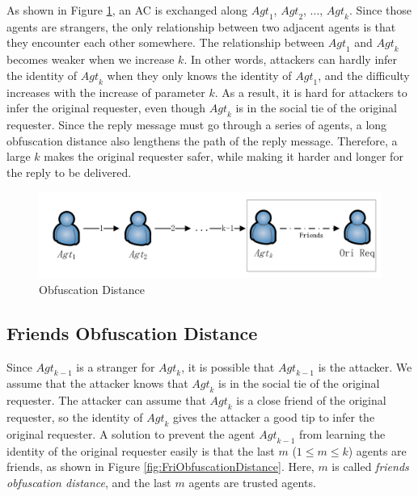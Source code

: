 As shown in Figure \ref{fig:ObfuscationDistance}, an AC is exchanged along ${Agt}_1$, ${Agt}_2$, ..., ${Agt}_k$. Since those agents are strangers, the only relationship between two adjacent agents is that they encounter each other somewhere. The relationship between ${Agt}_1$ and ${Agt}_k$ becomes weaker when we increase $k$. In other words, attackers can hardly infer the identity of ${Agt}_k$ when they only knows the identity of ${Agt}_1$, and the difficulty increases with the increase of parameter $k$. As a result, it is hard for attackers to infer the original requester, even though ${Agt}_k$ is in the social tie of the original requester. Since the reply message must go through a series of agents, a long obfuscation distance also lengthens the path of the reply message. Therefore, a large $k$ makes the original requester safer, while making it harder and longer for the reply to be delivered.

\begin{figure} [hbtp]
  \centering 
  \includegraphics[width=6.0in]{figures/ACPObfDis.png}
  \caption{Obfuscation Distance} 
  \label{fig:ObfuscationDistance} %
\end{figure}

\subsection{ Friends Obfuscation Distance}

\noindent Since ${Agt}_{k-1}$ is a stranger for ${Agt}_k$, it is possible that ${Agt}_{k-1}$ is the attacker. We assume that the attacker knows that ${Agt}_k$ is in the social tie of the original requester. The attacker can assume that ${Agt}_k$ is a close friend of the original requester, so the identity of ${Agt}_k$ gives the attacker a good tip to infer the original requester. A solution to prevent the agent ${Agt}_{k-1}$ from learning the identity of the original requester easily is that the last $m$ ($1\leq m\leq k$) agents are friends, as shown in Figure \ref{fig:FriObfuscationDistance}. Here, $m$ is called \textit{friends obfuscation distance}, and the last $m$ agents are trusted agents.

